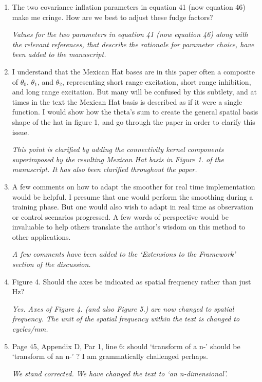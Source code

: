 \documentclass{article}
\begin{document}
\begin{enumerate}
\item The two covariance inflation parameters in equation 41 (now equation 46) make me cringe. How are we best to adjust these fudge factors?

\emph{Values for the two parameters in equation 41 (now equation 46) along with the relevant references, that describe the rationale for parameter choice, have been added to the manuscript.}

\item I understand that the Mexican Hat bases are in this paper often a composite of $\theta_0$, $\theta_1$, and $\theta_2$, representing short range excitation, short range inhibition, and long range excitation. But many will be confused by this subtlety, and at times in the text the Mexican Hat basis is described as if it were a single function. I would show how the theta's sum to create the general spatial basis shape of the hat in figure 1, and go through the paper in order to clarify this issue.

\emph{This point is clarified by adding the connectivity kernel components superimposed by the resulting Mexican Hat basis in Figure 1. of the manuscript. It has also been clarified throughout the paper.}

\item A few comments on how to adapt the smoother for real time implementation would be helpful. I presume that one would perform the smoothing during a training phase. But one would also wish to adapt in real time as observation or control scenarios progressed. A few words of perspective would be invaluable to help others translate the author's wisdom on this method to other applications.

\emph{A few comments have been added to the `Extensions to the Framework' section of the discussion.}

\item Figure 4. Should the axes be indicated as spatial frequency rather than just Hz?

\emph{Yes. Axes of Figure 4. (and also Figure 5.) are now changed to spatial frequency. The unit of the spatial frequency within the text is changed to cycles/mm.}

\item Page 45, Appendix D, Par 1, line 6: should `transform of a n-' should be `transform of an n-' ? I am grammatically challenged perhaps.

\emph{We stand corrected. We have changed the text to `an n-dimensional'.}

\end{enumerate}
\end{document}
